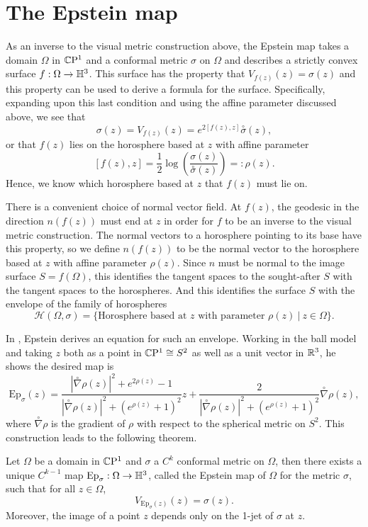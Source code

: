 \section{The Epstein map}


As an inverse to the visual metric construction above, the Epstein map takes a domain $\Omega$ in $\mathbb{C}\mathrm{P}^1$ and a conformal metric $\sigma$ on $\Omega$ and describes a strictly convex surface $f: \Omega \to \mathbb{H}^3$. 
This surface has the property that $V_{f(z)}(z) = \sigma(z)$ and this property can be used to derive a formula for the surface. 
Specifically, expanding upon this last condition and using the affine parameter discussed above, we see that 
\[
\sigma(z) = V_{f(z)}(z) = e^{2 [f(z),z]} \overset{\circ}{\sigma}(z),
\]
or that $f(z)$ lies on the horosphere based at $z$ with affine parameter
\[
[f(z),z] = \frac{1}{2} \log \left( \frac{\sigma(z)}{\overset{\circ}{\sigma}(z)} \right) =: \rho(z).
\]
Hence, we know which horosphere based at $z$ that $f(z)$ must lie on. 

There is a convenient choice of normal vector field. 
At $f(z)$, the geodesic in the direction $n(f(z))$ must end at $z$ in order for $f$ to be an inverse to the visual metric construction. 
The normal vectors to a horosphere pointing to its base have this property, so we define $n(f(z))$ to be the normal vector to the horosphere based at $z$ with affine parameter $\rho(z)$. 
Since $n$ must be normal to the image surface $S = f(\Omega)$, this identifies the tangent spaces to the sought-after $S$ with the tangent spaces to the horospheres. 
And this identifies the surface $S$ with the envelope of the family of horospheres
\[
\mathcal{H}(\Omega,\sigma) = \{ \text{Horosphere based at $z$ with parameter $\rho(z)$} \ | \ z \in \Omega \}.
\]


In \cite{epstein1984}, Epstein derives an equation for such an envelope. 
Working in the ball model and taking $z$ both as a point in $\mathbb{C}\mathrm{P}^1 \cong S^2$ as well as a unit vector in $\mathbb{R}^3$, he shows the desired map is 
\[
\mathrm{Ep}_\sigma(z) = \frac{|\overset{\circ}{\nabla}\rho(z)|^2 + e^{2\rho(z)} - 1}{|\overset{\circ}{\nabla}\rho(z)|^2 + (e^{\rho(z)}+1)^2} z + \frac{2}{|\overset{\circ}{\nabla}\rho(z)|^2 + (e^{\rho(z)}+1)^2} \overset{\circ}{\nabla}\rho(z),
\]
where $\overset{\circ}{\nabla}\rho$ is the gradient of $\rho$ with respect to the spherical metric on $S^2$. 
This construction leads to the following theorem. 


\begin{thm}
Let $\Omega$ be a domain in $\mathbb{C}\mathrm{P}^1$  and $\sigma$ a $C^k$ conformal metric on $\Omega$, then there exists a unique $C^{k-1}$ map $\mathrm{Ep}_\sigma : \Omega \to \mathbb{H}^3$, called the Epstein map of $\Omega$ for the metric $\sigma$, such that for all $z \in \Omega$,
\[
V_{\mathrm{Ep}_\sigma(z)}(z) = \sigma(z).
\]
Moreover, the image of a point $z$ depends only on the 1-jet of $\sigma$ at $z$.
\label{epstein-map-def}
\end{thm}


